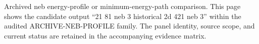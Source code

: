 Archived neb energy-profile or minimum-energy-path comparison. This page shows the candidate output ``21 81 neb 3 historical 2d 421 neb 3'' within the audited ARCHIVE-NEB-PROFILE family. The panel identity, source scope, and current status are retained in the accompanying evidence matrix.
